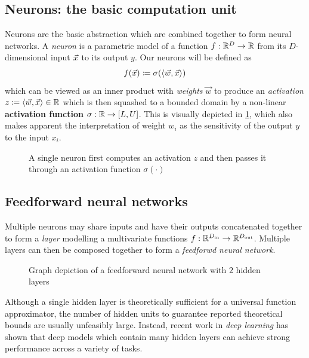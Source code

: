 \subsection{Neurons: the basic computation unit}

Neurons are the basic abstraction which are combined together to form
neural networks. A \emph{neuron} is a parametric model of a function $f : \mathbb{R}^D \to
\mathbb{R}$ from its $D$-dimensional input $\vec{x}$ to its output $y$. Our neurons will be
defined as
\begin{equation}
    f(\vec{x}) \coloneqq \sigma( \langle \vec{w}, \vec{x} \rangle)
\end{equation}
which can be viewed as an inner product with \emph{weights} $\vec{w}$ to
produce an \emph{activation} $z \coloneqq \langle \vec{w}, \vec{x} \rangle
\in \mathbb{R}$ which is then squashed to a bounded domain by a non-linear
\textbf{activation function} $\sigma : \mathbb{R} \to [L, U]$. This is visually
depicted in \cref{fig:nn-single}, which also makes apparent the
interpretation of weight $w_i$ as the sensitivity of the output $y$ to the
input $x_i$.

\begin{figure}[htpb]
    \centering
    
    \caption{A single neuron first computes an activation $z$ and then passes it through an activation function $\sigma(\cdot)$}
    \label{fig:nn-single}
\end{figure}

\subsection{Feedforward neural networks}

Multiple neurons may share inputs and have their outputs concatenated together
to form a \emph{layer} modelling a multivariate functions $f :
\mathbb{R}^{D_\text{in}} \to \mathbb{R}^{D_\text{out}}$. Multiple layers can then
be composed together to form a \emph{feedforwd neural network}.

\begin{figure}[htpb]
    \centering
    
    \caption{Graph depiction of a feedforward neural network with $2$ hidden layers}
    \label{fig:nn-ffw}
\end{figure}

Although a single hidden layer is theoretically sufficient for a universal
function approximator\citep{Cybenko1993}, the number of hidden units to
guarantee reported theoretical bounds are usually unfeasibly large. Instead,
recent work in \emph{deep learning} has shown that deep models which contain
many hidden layers can achieve strong performance across a variety of
tasks\citep{Bengio2011}.

